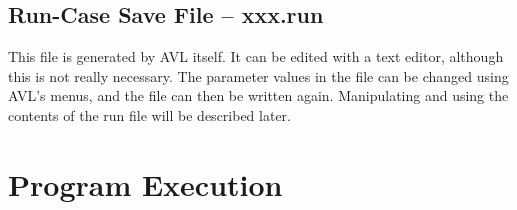 %
%
%
%
%
%
%
%
%
%
%
%
%
%
\section{Run-Case Save File -- xxx.run}

This file is generated by AVL itself.  It can be edited with a text editor,
although this is not really necessary.  The parameter values in the file
can be changed using AVL's menus, and the file can then be written again.
Manipulating and using the contents of the run file will be described later.



\chapter{Program Execution}

